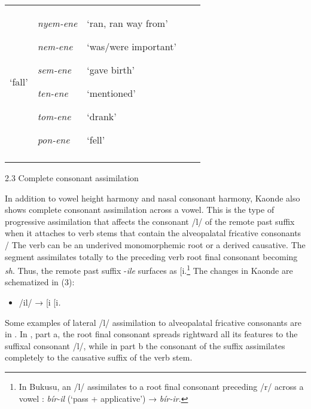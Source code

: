 \documentclass[output=paper]{langsci/langscibook}
\begin{document}
\begin{tabular}{lllll}
\mdseries ‘fall’ & {\mdseries \emph{nyem-ene}}

{\mdseries \emph{nem-ene}}

{\mdseries \emph{sem-ene}}

{\mdseries \emph{ten-ene  }}

{\mdseries \emph{tom-ene }}

\mdseries \emph{pon-ene} & {\mdseries ‘ran, ran way from’}

{\mdseries ‘was/were important’}

{\mdseries ‘gave birth’}

{\mdseries ‘mentioned’}

{\mdseries ‘drank’}

\mdseries ‘fell’\\
\lspbottomrule
\end{tabular}
\begin{stylelsSectionii}
2.3 Complete consonant assimilation
\end{stylelsSectionii}

In addition to vowel height harmony and nasal consonant harmony, Kaonde also shows complete consonant assimilation across a vowel. This is the type of progressive assimilation that affects the consonant /l/ of the remote past suffix when it attaches to verb stems that contain the alveopalatal fricative consonants / The verb can be an underived monomorphemic root or a derived causative. The segment assimilates totally to the preceding verb root final consonant becoming \textit{sh}. Thus, the remote past suffix -\emph{ile}\textit{ }surfaces as [i\textstyleipa{ʃe],}.\footnote{ In Bukusu, an /l/ assimilates to a root final consonant preceding /r/ across a vowel \citep{Hyman2003}: \textit{bír-il} (‘pass + applicative’) → \textit{bír-ir}.} The changes in Kaonde are schematized in (3):

\begin{itemize}
\item \begin{stylelsLanginfo}
/il/ → [i\textstyleipa{ʃ],} [i\textstyleipa{ʒ] after verb stems ending in }\textstyleipa{\textit{ }}\textit{.}
\end{stylelsLanginfo}\end{itemize}

Some examples of lateral /l/ assimilation to alveopalatal fricative consonants are in . In , part a, the root final consonant spreads rightward all its features to the suffixal consonant /l/, while in part b the consonant of the suffix assimilates completely to the causative suffix of the verb stem. 
\end{document}
